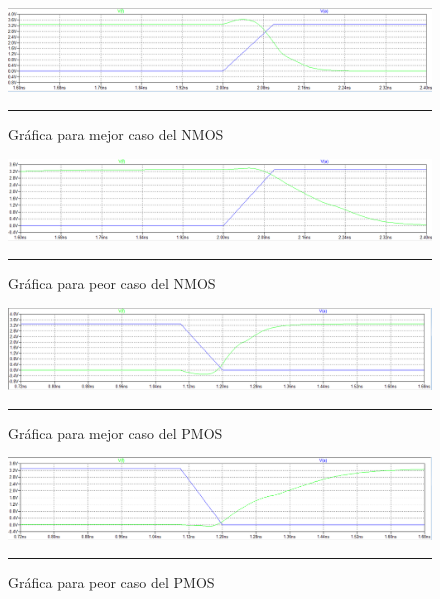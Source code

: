 \documentclass[12pt,a4paper]{article} %
\begin{document}
\begin{figure}[htbp]
\begin{center}
    \includegraphics[scale=0.5]{./Mejor_caso_red_nmos.png}
    \rule{35em}{0.5pt}
  \caption[Captura]{Gráfica para mejor caso del NMOS}
  \label{fig:CircuitoFO2}
  \end{center}
\end{figure}

\begin{figure}[htbp]
\begin{center}
    \includegraphics[scale=0.5]{./Peor_caso_red_nmos.png}
    \rule{35em}{0.5pt}
  \caption[Captura]{Gráfica para peor caso del NMOS}
  \label{fig:CircuitoFO2}
  \end{center}
\end{figure}

\begin{figure}[htbp]
\begin{center}
    \includegraphics[scale=0.5]{./Mejor_caso_red_pmos.png}
    \rule{35em}{0.5pt}
  \caption[Captura]{Gráfica para mejor caso del PMOS}
  \label{fig:CircuitoFO2}
  \end{center}
\end{figure}


\begin{figure}[htbp]
\begin{center}
    \includegraphics[scale=0.5]{./Peor_caso_red_pmos.png}
    \rule{35em}{0.5pt}
  \caption[Captura]{Gráfica para peor caso del PMOS}
  \label{fig:CircuitoFO2}
  \end{center}
\end{figure}
\end{document}

